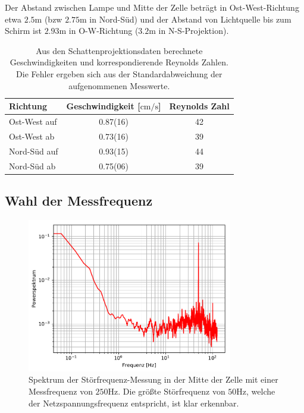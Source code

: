 \documentclass[12pt,a4paper,titlepage,headinclude]{scrartcl}
\numberwithin{equation}{subsection}
\begin{document}
Der Abstand zwischen Lampe und Mitte der Zelle beträgt in Ost-West-Richtung etwa $2.5\si\meter$ (bzw $2.75\si\meter$ in Nord-Süd) und der Abstand von Lichtquelle bis zum Schirm ist $2.93\si\meter$ in O-W-Richtung ($3.2\si\meter$ in N-S-Projektion).
\begin{table}[h]
	\centering
	\begin{tabular}{|l|cc|}
                \hline Richtung     & Geschwindigkeit [$\si{\centi\meter\per\second}$] & Reynolds Zahl\\\hline
		Ost-West auf        & 0.87(16)                                         & 42\\
		Ost-West ab         & 0.73(16)                                         & 39\\
		Nord-Süd auf        & 0.93(15)                                         & 44\\
		Nord-Süd ab         & 0.75(06)                                         & 39\\\hline
	\end{tabular}
	\caption{Aus den Schattenprojektionsdaten berechnete Geschwindigkeiten und korrespondierende Reynolds Zahlen. Die Fehler ergeben sich aus der Standardabweichung der aufgenommenen Messwerte.\label{tab:schatten}}
\end{table}



\subsection{Wahl der Messfrequenz}

\begin{figure}[!ht]
\centering
\includegraphics[width=0.8\textwidth]{stoer}
\caption{Spektrum der Störfrequenz-Messung in der Mitte der Zelle mit einer Messfrequenz von $250\si{\hertz}$. Die größte Störfrequenz von $50\si{\hertz}$, welche der Netzspannungsfrequenz entspricht, ist klar erkennbar.}
\label{fig:stoer}
\end{figure}
\end{document}

